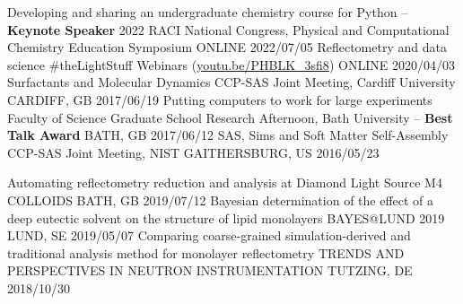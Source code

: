 \vspace{-0.4cm}
\begin{cvhonors}
  \cvhonor
    {Developing and sharing an undergraduate chemistry course for Python -- \textbf{Keynote Speaker}}
    {2022 RACI National Congress, Physical and Computational Chemistry Education Symposium}
    {ONLINE}
    {2022/07/05}
  \cvhonor
    {Reflectometry and data science}
    {\#theLightStuff Webinars (\href{https://youtu.be/PHBLK_3sfi8}{youtu.be/PHBLK\_3sfi8})}
    {ONLINE}
    {2020/04/03}
  \cvhonor
    {Surfactants and Molecular Dynamics}
    {CCP-SAS Joint Meeting, Cardiff University}
    {CARDIFF, GB}
    {2017/06/19}
  \cvhonor
    {Putting computers to work for large experiments}
    {Faculty of Science Graduate School Research Afternoon, Bath University -- \textbf{Best Talk Award}}
    {BATH, GB}
    {2017/06/12}
  \cvhonor
    {SAS, Sims and Soft Matter Self-Assembly}
    {CCP-SAS Joint Meeting, NIST}
    {GAITHERSBURG, US}
    {2016/05/23}
\end{cvhonors}
\begin{cvhonors}
  \cvhonor
    {Automating reflectometry reduction and analysis at Diamond Light Source}
    {M4 COLLOIDS}
    {BATH, GB}
    {2019/07/12}
  \cvhonor
    {Bayesian determination of the effect of a deep eutectic solvent on the structure of lipid monolayers}
    {BAYES@LUND 2019}
    {LUND, SE}
    {2019/05/07}
  \cvhonor
    {Comparing coarse-grained simulation-derived and traditional analysis method for monolayer reflectometry}
    {TRENDS AND PERSPECTIVES IN NEUTRON INSTRUMENTATION}
    {TUTZING, DE}
    {2018/10/30}
\end{cvhonors}
